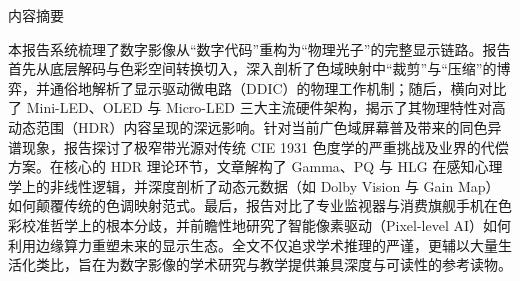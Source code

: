 \documentclass[12pt, a4paper]{ctexart}
\begin{document}
{} %
\begin{center}
    {\heiti{} 内容摘要} 
\end{center}
\vspace{1em}
{\fangsong{} %
\setlength{\parindent}{2em} %
本报告系统梳理了数字影像从“数字代码”重构为“物理光子”的完整显示链路。报告首先从底层解码与色彩空间转换切入，深入剖析了色域映射中“裁剪”与“压缩”的博弈，并通俗地解析了显示驱动微电路（DDIC）的物理工作机制；随后，横向对比了 Mini-LED、OLED 与 Micro-LED 三大主流硬件架构，揭示了其物理特性对高动态范围（HDR）内容呈现的深远影响。针对当前广色域屏幕普及带来的同色异谱现象，报告探讨了极窄带光源对传统 CIE 1931 色度学的严重挑战及业界的代偿方案。在核心的 HDR 理论环节，文章解构了 Gamma、PQ 与 HLG 在感知心理学上的非线性逻辑，并深度剖析了动态元数据（如 Dolby Vision 与 Gain Map）如何颠覆传统的色调映射范式。最后，报告对比了专业监视器与消费旗舰手机在色彩校准哲学上的根本分歧，并前瞻性地研究了智能像素驱动（Pixel-level AI）如何利用边缘算力重塑未来的显示生态。全文不仅追求学术推理的严谨，更辅以大量生活化类比，旨在为数字影像的学术研究与教学提供兼具深度与可读性的参考读物。\par
}

\vfill
\end{document}
